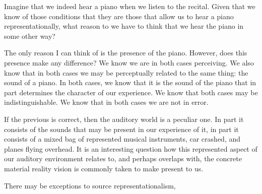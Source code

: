 \documentclass[sloppy, journal, git, bytitle, dodraft]{humapap}
\begin{document}
Imagine that we indeed hear a piano when we listen to the recital. Given that we know of those conditions that they are those that allow us to hear a piano representationally, what reason to we have to think that we hear the piano in some other way?

The only reason I can think of is the presence of the piano. However, does this presence make any difference? We know we are in both cases perceiving. We also know that in both cases we may be perceptually related to the same thing: the sound of a piano. In both cases, we know that it is the sound of the piano that in part determines the character of our experience. We know that both cases may be indistinguishable. We know that in both cases we are not in error. 




\sect If the previous is correct, then the auditory world is a peculiar one. In part it consists of the sounds that may be present in our experience of it, in part it consists of a mixed bag of represented musical instruments, car crashed, and planes flying overhead. It is an interesting question how this represented aspect of our auditory environment relates to, and perhaps overlaps with, the concrete material reality vision is commonly taken to make present to us. 

There may be exceptions to source representationalism, 

\end{document}

